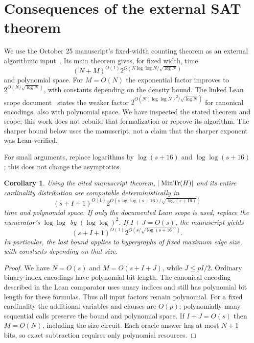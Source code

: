 \documentclass[11pt]{article}
\newtheorem{corollary}[theorem]{Corollary}
\theoremstyle{remark}\newtheorem{remark}[theorem]{Remark}
\newcommand{\MT}{\mathop{\rm MinTr}}
\begin{document}
\section{Consequences of the external SAT theorem}\label{sec:time}
We use the October 25 manuscript's fixed-width counting theorem as an
external algorithmic input~\cite{oai}. Its main theorem gives, for fixed
width, time
\[
 (N+M)^{O(1)}2^{O(N\log\log N/\sqrt{\log N})}
\]
and polynomial space. For $M=O(N)$ the exponential factor improves to
$2^{O(N/\sqrt{\log N})}$, with constants depending on the density bound.
The linked Lean scope document~\cite{scope} states the weaker factor
$2^{O(N(\log\log N)^2/\sqrt{\log N})}$ for canonical encodings, also with
polynomial space. We have inspected the stated theorem and scope; this work
does not rebuild that formalization or reprove its algorithm. The sharper
bound below uses the manuscript, not a claim that the sharper exponent was
Lean-verified.

For small arguments, replace logarithms by $\log(s+16)$ and
$\log\log(s+16)$; this does not change the asymptotics.

\begin{corollary}\label{cor:time}
Using the cited manuscript theorem, $|\MT(H)|$ and its entire cardinality
distribution are computable deterministically in
\begin{equation}\label{eq:time}
 (s+I+1)^{O(1)}
 2^{O(s\log\log(s+16)/\sqrt{\log(s+16)})}
\end{equation}
time and polynomial space. If only the documented Lean scope is used, replace
the numerator's $\log\log$ by $(\log\log)^2$.
If $I+J=O(s)$, the manuscript yields
\[
 (s+I+1)^{O(1)}2^{O(s/\sqrt{\log(s+16)})}.
\]
In particular, the last bound applies to hypergraphs of fixed maximum edge
size, with constants depending on that size.
\end{corollary}
\begin{proof}
We have $N=O(s)$ and $M=O(s+I+J)$, while $J\le pI/2$. Ordinary binary-index
encodings have polynomial bit length. The canonical encoding described in
the Lean comparator uses unary indices and still has polynomial bit length
for these formulas. Thus all input factors remain polynomial. For a fixed
cardinality the additional variables and clauses are $O(p)$; polynomially
many sequential calls preserve the bound and polynomial space. If
$I+J=O(s)$ then $M=O(N)$, including the size circuit. Each oracle answer has
at most $N+1$ bits, so exact subtraction requires only polynomial resources.
\end{proof}
\end{document}
